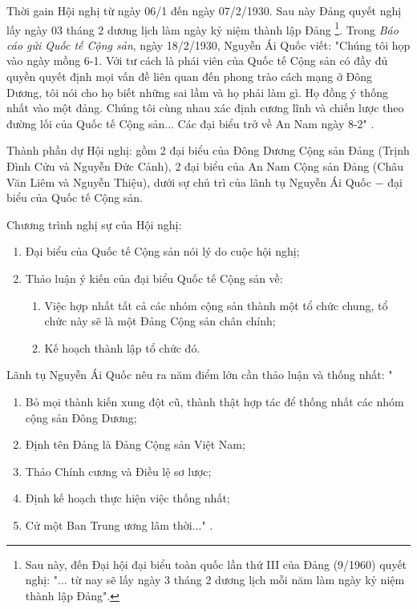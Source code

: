 Thời gain Hội nghị từ ngày 06/1 đến ngày 07/2/1930. Sau này Đảng quyết nghị lấy ngày 03 tháng 2 dương lịch làm ngày kỷ niệm thành lập Đảng \footnote{Sau này, đến Đại hội đại biểu toàn quốc lần thứ III của Đảng (9/1960) quyết nghị: "... từ nay sẽ lấy ngày 3 tháng 2 dương lịch mỗi năm làm ngày kỷ niệm thành lập Đảng".}. Trong \textit{Báo cáo gửi Quốc tế Cộng sản}, ngày 18/2/1930, Nguyễn Ái Quốc viết: "Chúng tôi họp vào ngày mồng 6-1. Với tư cách là phái viên của Quốc tế Cộng sản có đầy đủ quyền quyết định mọi vấn đề liên quan đến phong trào cách mạng ở Đông Dương, tôi nói cho họ biết những sai lầm và họ phải làm gì. Họ đồng ý thống nhất vào một đảng. Chúng tôi cùng nhau xác định cương lĩnh và chiến lược theo đường lối của Quốc tế Cộng sản... Các đại biểu trở về An Nam ngày 8-2" .

Thành phần dự Hội nghị: gồm 2 đại biểu của Đông Dương Cộng sản Đảng (Trịnh Đình Cửu và Nguyễn Đức Cảnh), 2 đại biểu của An Nam Cộng sản Đảng (Châu Văn Liêm và Nguyễn Thiệu), dưới sự chủ trì của lãnh tụ Nguyễn Ái Quốc $-$ đại biểu của Quốc tế Cộng sản.

Chương trình nghị sự của Hội nghị:
\begin{enumerate}
\item Đại biểu của Quốc tế Cộng sản nói lý do cuộc hội nghị;
\item Thảo luận ý kiến của đại biểu Quốc tế Cộng sản về:
\begin{enumerate}
\item Việc hợp nhất tất cả các nhóm cộng sản thành một tổ chức chung, tổ chức này sẽ là một Đảng Cộng sản chân chính;
\item Kế hoạch thành lập tổ chức đó.
\end{enumerate}
\end{enumerate}

Lãnh tụ Nguyễn Ái Quốc nêu ra năm điểm lớn cần thảo luận và thống nhất:
"\begin{enumerate}
\item Bỏ mọi thành kiến xung đột cũ, thành thật hợp tác để thống nhất các nhóm cộng sản Đông Dương;
\item Định tên Đảng là Đảng Cộng sản Việt Nam;
\item Thảo Chính cương và Điều lệ sơ lược;
\item Định kế hoạch thực hiện việc thống nhất;
\item Cử một Ban Trung ương lâm thời..." .
\end{enumerate}

